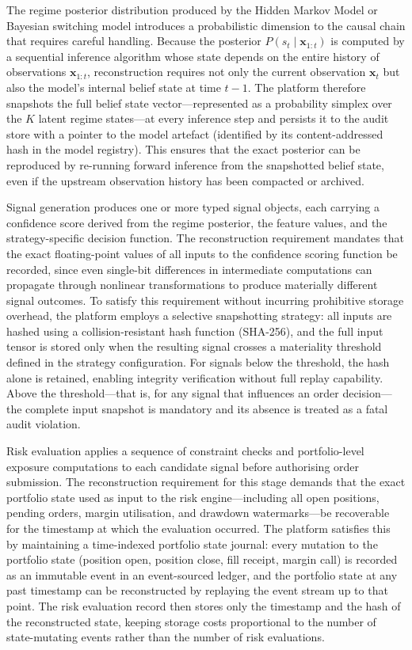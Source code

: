 \documentclass[12pt,openany]{book}
\numberwithin{equation}{chapter}
\theoremstyle{plain}
\theoremstyle{definition}
\theoremstyle{remark}
\begin{document}
The regime posterior distribution produced by the Hidden Markov Model or Bayesian switching model introduces a probabilistic dimension to the causal chain that requires careful handling. Because the posterior $P(s_t \mid \mathbf{x}_{1:t})$ is computed by a sequential inference algorithm whose state depends on the entire history of observations $\mathbf{x}_{1:t}$, reconstruction requires not only the current observation $\mathbf{x}_t$ but also the model's internal belief state at time $t-1$. The platform therefore snapshots the full belief state vector—represented as a probability simplex over the $K$ latent regime states—at every inference step and persists it to the audit store with a pointer to the model artefact (identified by its content-addressed hash in the model registry). This ensures that the exact posterior can be reproduced by re-running forward inference from the snapshotted belief state, even if the upstream observation history has been compacted or archived.

Signal generation produces one or more typed signal objects, each carrying a confidence score derived from the regime posterior, the feature values, and the strategy-specific decision function. The reconstruction requirement mandates that the exact floating-point values of all inputs to the confidence scoring function be recorded, since even single-bit differences in intermediate computations can propagate through nonlinear transformations to produce materially different signal outcomes. To satisfy this requirement without incurring prohibitive storage overhead, the platform employs a selective snapshotting strategy: all inputs are hashed using a collision-resistant hash function (SHA-256), and the full input tensor is stored only when the resulting signal crosses a materiality threshold defined in the strategy configuration. For signals below the threshold, the hash alone is retained, enabling integrity verification without full replay capability. Above the threshold—that is, for any signal that influences an order decision—the complete input snapshot is mandatory and its absence is treated as a fatal audit violation.

Risk evaluation applies a sequence of constraint checks and portfolio-level exposure computations to each candidate signal before authorising order submission. The reconstruction requirement for this stage demands that the exact portfolio state used as input to the risk engine—including all open positions, pending orders, margin utilisation, and drawdown watermarks—be recoverable for the timestamp at which the evaluation occurred. The platform satisfies this by maintaining a time-indexed portfolio state journal: every mutation to the portfolio state (position open, position close, fill receipt, margin call) is recorded as an immutable event in an event-sourced ledger, and the portfolio state at any past timestamp can be reconstructed by replaying the event stream up to that point. The risk evaluation record then stores only the timestamp and the hash of the reconstructed state, keeping storage costs proportional to the number of state-mutating events rather than the number of risk evaluations.
\end{document}

